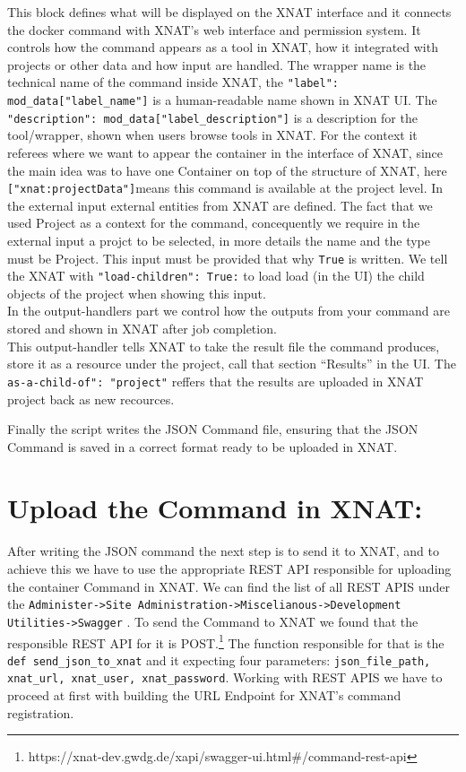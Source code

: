 This block defines what will be displayed on the XNAT interface and it connects the docker command with XNAT's web interface and permission system. It controls how the command appears as a tool in XNAT, how it integrated with projects or other data and how input are handled.
The wrapper name is the technical name of the command inside XNAT, the \texttt{"label": mod\_data["label\_name"]} is a human-readable name shown in XNAT UI. The \texttt{"description": mod\_data["label\_description"]} is a description for the tool/wrapper, shown when users browse tools in XNAT. For the context it referees where we want to appear the container in the interface of XNAT, since the main idea was to have one Container on top of the structure of XNAT, here \texttt{["xnat:projectData"]}means this command is available at the project level.
 In the external input external entities from XNAT are defined. The fact that we used Project as a context for the command, concequently we require in the external input a projct to be selected, in more details the name and the type must be Project. This input must be provided that why \texttt{True} is written.
 We tell the XNAT with \texttt{"load-children": True:} to load load (in the UI) the child objects of the project when showing this input.\\
 In the output-handlers part we control  how the outputs from your command are stored and shown in XNAT after job completion.\\
 This output-handler tells XNAT to take the result file the command produces, store it as a resource under the project, call that section “Results” in the UI. 
 The \texttt{as-a-child-of": "project"} reffers that the results are uploaded in XNAT project back as new recources.

 Finally the script writes the JSON Command file, ensuring that the JSON Command is saved in a correct format ready to be uploaded in XNAT.
 
 \section{Upload the Command in XNAT:}

 After writing the JSON command the next step is to send it to XNAT, and to achieve this we have to use the appropriate REST API responsible for uploading the container Command in XNAT.
 We can find the list of all REST APIS under the \texttt{Administer->Site Administration->Miscelianous->Development Utilities->Swagger} .
 To send the Command to XNAT we found that the responsible REST API for it is POST.\footnote{https://xnat-dev.gwdg.de/xapi/swagger-ui.html\#/command-rest-api}
 The function responsible for that is the \texttt{def send\_json\_to\_xnat} and it expecting four parameters: \texttt{json\_file\_path, xnat\_url, xnat\_user, xnat\_password}. Working with REST APIS we have to proceed at first with building the URL Endpoint for XNAT’s command registration.
 
